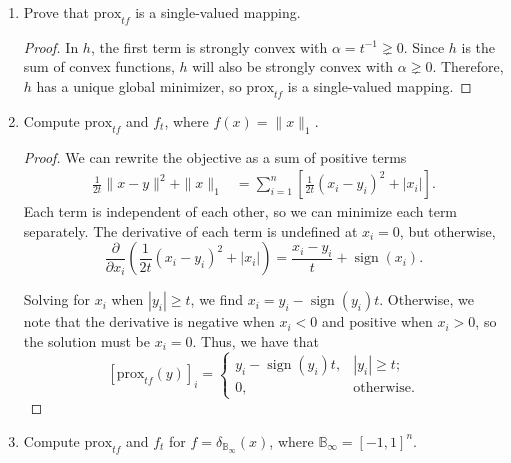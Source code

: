 \documentclass[11pt]{amsart}
\newcommand{\prox}{\mathrm{prox}}
\begin{document}
\begin{enumerate}
\begin{enumerate}
\item Prove that $\prox_{t f}$ is a single-valued mapping. 
  \begin{proof}
    In $h$, the first term is strongly convex with $\alpha = t^{-1} \gneq
    0$. Since $h$ is the sum of convex functions, $h$ will also be strongly
    convex with $\alpha \gneq 0$. Therefore, $h$ has a unique global minimizer,
    so $\prox_{t f}$ is a single-valued mapping.
  \end{proof}

\item Compute $\prox_{t f}$ and $f_t$, where $f(x) = \|x\|_1$. 

  \begin{proof}
    We can rewrite the objective as a sum of positive terms
    \begin{align*}
      \frac{1}{2t}\|x-y\|^2 + \|x\|_1
      &= \sum_{i=1}^n\left[
        \frac{1}{2t}\left(x_i - y_i\right)^2
        +
        |x_i|
        \right].
    \end{align*}
    Each term is independent of each other, so we can minimize each term
    separately. The derivative of each term is undefined at $x_i = 0$, but
    otherwise,
    \begin{equation*}
      \frac{\partial}{\partial x_i}\left(
        \frac{1}{2t}\left(x_i - y_i\right)^2 + |x_i|
      \right)
      = \frac{x_i - y_i}{t} + \operatorname{sign}\left(x_i\right).
    \end{equation*}

    Solving for $x_i$ when $|y_i| \geq t$, we find
    $x_i = y_i - \operatorname{sign}\left(y_i\right)t$. Otherwise, we note that
    the derivative is negative when $x_i < 0$ and positive when $x_i > 0$, so
    the solution must be $x_i = 0$. Thus, we have that
    \begin{equation*}
      \left[\prox_{t f}(y)\right]_i = \begin{cases}
        y_i - \operatorname{sign}\left(y_i\right)t, & |y_i| \geq t; \\
        0, & \text{otherwise.}
      \end{cases}
    \end{equation*}
  \end{proof}

\item Compute $\prox_{t f}$ and $f_t$ for $f = \delta_{\mathbb{B}_{\infty}}(x)$, 
  where $\mathbb{B}_\infty = [-1,1]^n$.


\end{enumerate}
\end{enumerate}
\end{document}
